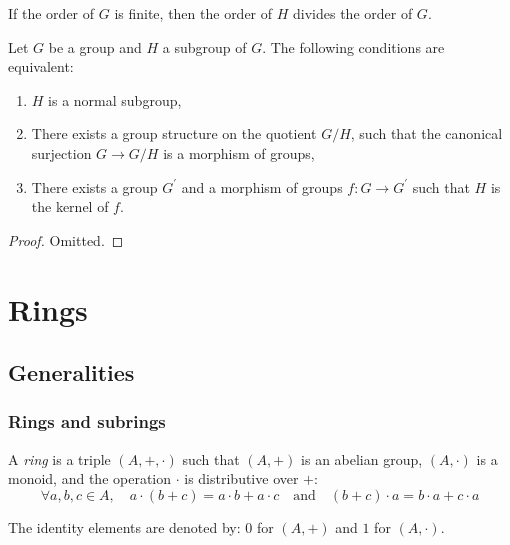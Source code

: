 \documentclass[12pt]{report}
\begin{document}
\begin{remark} \label{rem-group-subgroup-order-divisibility}
    If the order of $G$ is finite, then the order of $H$ divides the order of $G$.
\end{remark}

\begin{proposition} \label{prop-group-quotient}
    Let $G$ be a group and $H$ a subgroup of $G$. The following conditions are equivalent:
    \begin{enumerate}[label=(\roman*)]
        \item $H$ is a normal subgroup,
        \item There exists a group structure on the quotient $G / H$, such that the canonical surjection $G \to G / H$ is a morphism of groups,
        \item There exists a group $G^{\prime}$ and a morphism of groups $f \colon G \to G^{\prime}$ such that $H$ is the kernel of $f$.
    \end{enumerate}
\end{proposition}

\begin{proof}
    Omitted.
\end{proof}

\newpage
\section{Rings}
\subsection{Generalities}
\subsubsection{Rings and subrings}

\begin{definition} \label{def-ring}
    A \emph{ring} is a triple $(A, +, \cdot)$ such that $(A, +)$ is an abelian group, $(A, \cdot)$ is a monoid, and the operation $\cdot$ is distributive over $+$:
    \[
        \forall a, b, c \in A, \quad a \cdot (b + c) = a \cdot b + a \cdot c \quad \text{and} \quad (b + c) \cdot a = b \cdot a + c \cdot a
    \]
\end{definition}

\begin{notation} \label{not-ring-identities}
    The identity elements are denoted by: $0$ for $(A, +)$ and $1$ for $(A, \cdot)$.
\end{notation}
\end{document}
